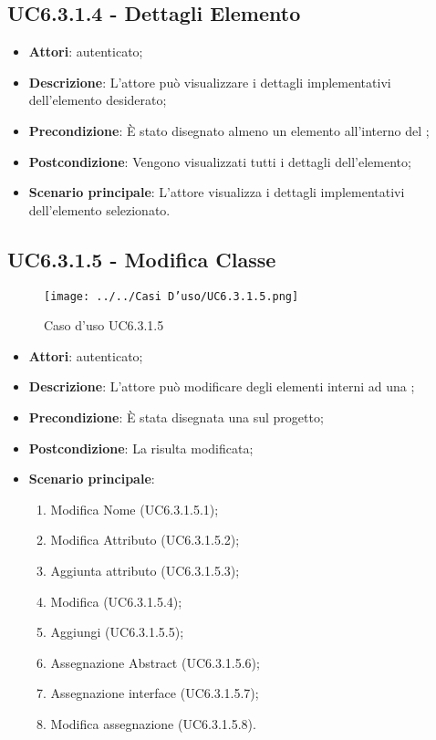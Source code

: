 \subsection{UC6.3.1.4 - Dettagli Elemento}
\label{ssec:UC6.3.1.4}
\begin{itemize}
\item \textbf{Attori}:  autenticato;
\item \textbf{Descrizione}: L'attore può visualizzare i dettagli implementativi dell'elemento desiderato;
\item \textbf{Precondizione}: È stato disegnato almeno un elemento all'interno del ;
\item \textbf{Postcondizione}: Vengono visualizzati tutti i dettagli dell'elemento;
\item \textbf{Scenario principale}: L'attore visualizza i dettagli implementativi dell'elemento selezionato.
\end{itemize}
\newpage
\subsection{UC6.3.1.5 - Modifica Classe}
\label{ssec:UC6.3.1.5}
\begin{figure}[h!]
\centering
\texttt{[image: ../../Casi D'uso/UC6.3.1.5.png]}
\caption{Caso d'uso UC6.3.1.5}
 \end{figure}
\begin{itemize}
\item \textbf{Attori}:  autenticato;
\item \textbf{Descrizione}: L'attore può modificare degli elementi interni ad una ;
\item \textbf{Precondizione}: È stata disegnata una  sul progetto;
\item \textbf{Postcondizione}: La  risulta modificata;
\item \textbf{Scenario principale}: \begin{enumerate}\item Modifica Nome (UC6.3.1.5.1);\item Modifica Attributo (UC6.3.1.5.2);\item Aggiunta attributo (UC6.3.1.5.3);\item Modifica  (UC6.3.1.5.4);\item Aggiungi  (UC6.3.1.5.5);\item Assegnazione Abstract (UC6.3.1.5.6);\item Assegnazione interface (UC6.3.1.5.7);\item Modifica assegnazione  (UC6.3.1.5.8).
 \end{enumerate}
\end{itemize}
